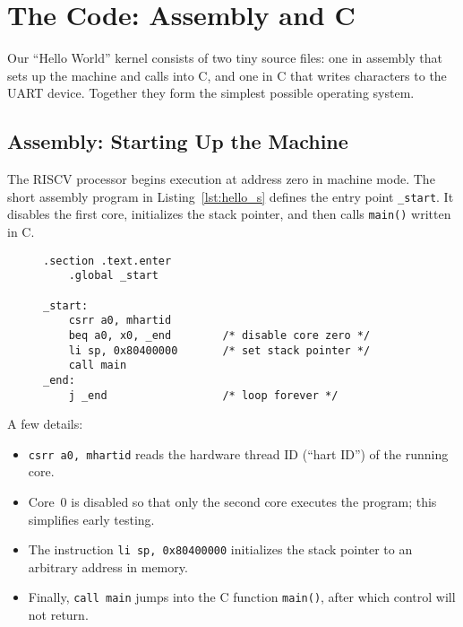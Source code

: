 \section{The Code: Assembly and C}

Our ``Hello World'' kernel consists of two tiny source files: one in assembly
that sets up the machine and calls into C, and one in C that writes characters
to the UART device.  Together they form the simplest possible operating system.

\subsection{Assembly: Starting Up the Machine}

The RISC\textendash V processor begins execution at address zero in machine
mode.  The short assembly program in Listing~\ref{lst:hello_s} defines the entry
point \texttt{\_start}.  It disables the first core, initializes the stack
pointer, and then calls \texttt{main()} written in C.

\begin{figure}[H]
\centering
\begin{minipage}{0.9\textwidth}
\begin{lstlisting}[style=oscode,language={[x86masm]Assembler},caption={Startup assembly for EmbryOS},label={lst:hello_s}]
    .section .text.enter
    .global _start

_start:
    csrr a0, mhartid
    beq a0, x0, _end        /* disable core zero */
    li sp, 0x80400000       /* set stack pointer */
    call main
_end:
    j _end                  /* loop forever */
\end{lstlisting}
\end{minipage}
\end{figure}

A few details:

\begin{itemize}
  \item \texttt{csrr a0, mhartid} reads the hardware thread ID (``hart ID'') of
        the running core.
  \item Core~0 is disabled so that only the second core executes the program;
        this simplifies early testing.
  \item The instruction \texttt{li sp, 0x80400000} initializes the stack
        pointer to an arbitrary address in memory.
  \item Finally, \texttt{call main} jumps into the C function
        \texttt{main()}, after which control will not return.
\end{itemize}

